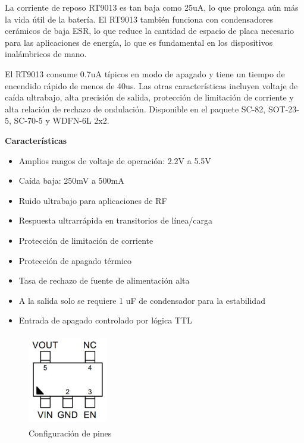 La corriente de reposo RT9013 es tan baja como 25uA, lo que prolonga aún más la vida útil de la batería. El RT9013 también funciona con condensadores cerámicos de baja ESR, lo que reduce la cantidad de espacio de placa necesario para las aplicaciones de energía, lo que es fundamental en los dispositivos inalámbricos de mano.

El RT9013 consume 0.7uA típicos en modo de apagado y tiene un tiempo de encendido rápido de menos de 40us. Las otras características incluyen voltaje de caída ultrabajo, alta precisión de salida, protección de limitación de corriente y alta relación de rechazo de ondulación. Disponible en el paquete SC-82, SOT-23-5, SC-70-5 y WDFN-6L 2x2.

\textbf{Características}

\begin{itemize}
    \item Amplios rangos de voltaje de operación: 2.2V a 5.5V
    \item Caída baja: 250mV a 500mA
    \item Ruido ultrabajo para aplicaciones de RF
    \item Respuesta ultrarrápida en transitorios de línea/carga
    \item Protección de limitación de corriente
    \item Protección de apagado térmico
    \item Tasa de rechazo de fuente de alimentación alta
    \item A la salida solo se requiere 1 uF de condensador para la estabilidad
    \item Entrada de apagado controlado por lógica TTL
\end{itemize}

\begin{figure}[H]
    \centering
    \includegraphics[width=3.5cm, height=4cm]{imagenes/esquematico RT9013.pdf}
    \caption{Configuración de pines}
    \label{imag:pines_RT9013}
\end{figure}

